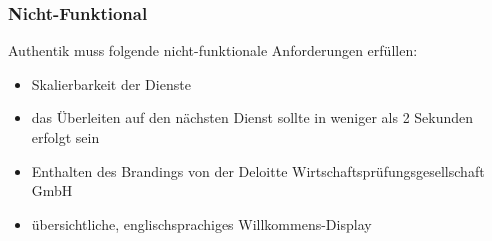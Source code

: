 \subsubsection{Nicht-Funktional}
\label{sec:Nicht-Funktional}
Authentik muss folgende nicht-funktionale Anforderungen erfüllen:
\begin{itemize} [label=--]
	\item Skalierbarkeit der Dienste
	\item das Überleiten auf den nächsten Dienst sollte in weniger als 2 Sekunden erfolgt sein
	\item Enthalten des Brandings von der Deloitte Wirtschaftsprüfungsgesellschaft GmbH
	\item übersichtliche, englischsprachiges Willkommens-Display
\end{itemize}
	